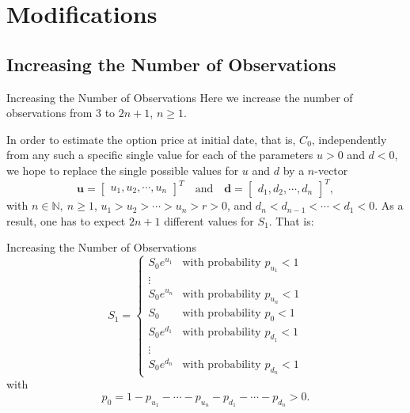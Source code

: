 \documentclass[aspectratio=169,xcolor=dvipsnames]{beamer}
\begin{document}
	\section{Modifications}
	\subsection{Increasing the Number of Observations}
	\begin{frame}{Increasing the Number of Observations}
	Here we increase the number of observations from $3$ to $2n+1$, $n \geq 1$.
	
	In order to estimate the option price at initial date, that is, $C_0$, independently from any such a specific single value for each of the parameters $u > 0$ and $d < 0$, we hope to replace the single possible values for $u$ and $d$ by a $n$-vector
	\[
	\mathbf{u} = 
	\begin{bmatrix}
		u_1, u_2, \cdots, u_n
	\end{bmatrix}^T 
	\quad \text{and} \quad
	\mathbf{d} = 
	\begin{bmatrix}
		d_1, d_2, \cdots, d_n
	\end{bmatrix}^T,
	\]
	with $n \in \mathbb{N},\ n \geq 1$, $u_1 > u_2 > \cdots > u_n > r > 0$, and $d_n < d_{n-1} < \cdots < d_1 < 0$. As a result, one has to expect $2n+1$ different values for $S_1$. That is:
		\end{frame}
	
		\begin{frame}{Increasing the Number of Observations}
	\[
	S_1 =
	\begin{cases}
		S_0 e^{u_1} & \text{with probability } p_{u_1} < 1 \\
		\vdots \\
		S_0 e^{u_n} & \text{with probability } p_{u_n} < 1 \\
		S_0         & \text{with probability } p_0 < 1 \\
		S_0 e^{d_1} & \text{with probability } p_{d_1} < 1 \\
		\vdots \\
		S_0 e^{d_n} & \text{with probability } p_{d_n} < 1
	\end{cases}
	\]
		with
		\[
		p_0 = 1 - p_{u_1} - \cdots - p_{u_n} - p_{d_1} - \cdots - p_{d_n} > 0.
		\]
	\end{frame}
\end{document}
